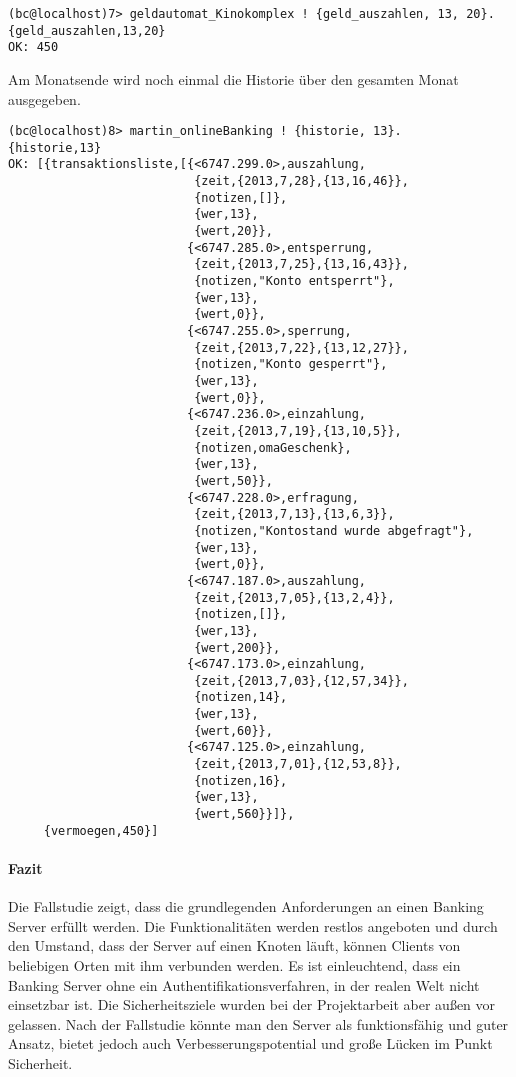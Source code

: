 \begin{lstlisting}
(bc@localhost)7> geldautomat_Kinokomplex ! {geld_auszahlen, 13, 20}.
{geld_auszahlen,13,20}
OK: 450  
\end{lstlisting}
Am Monatsende wird noch einmal die Historie über den gesamten Monat ausgegeben. 
\begin{lstlisting}
(bc@localhost)8> martin_onlineBanking ! {historie, 13}.                   
{historie,13}
OK: [{transaktionsliste,[{<6747.299.0>,auszahlung,
                          {zeit,{2013,7,28},{13,16,46}},
                          {notizen,[]},
                          {wer,13},
                          {wert,20}},
                         {<6747.285.0>,entsperrung,
                          {zeit,{2013,7,25},{13,16,43}},
                          {notizen,"Konto entsperrt"},
                          {wer,13},
                          {wert,0}},
                         {<6747.255.0>,sperrung,
                          {zeit,{2013,7,22},{13,12,27}},
                          {notizen,"Konto gesperrt"},
                          {wer,13},
                          {wert,0}},
                         {<6747.236.0>,einzahlung,
                          {zeit,{2013,7,19},{13,10,5}},
                          {notizen,omaGeschenk},
                          {wer,13},
                          {wert,50}},
                         {<6747.228.0>,erfragung,
                          {zeit,{2013,7,13},{13,6,3}},
                          {notizen,"Kontostand wurde abgefragt"},
                          {wer,13},
                          {wert,0}},
                         {<6747.187.0>,auszahlung,
                          {zeit,{2013,7,05},{13,2,4}},
                          {notizen,[]},
                          {wer,13},
                          {wert,200}},
                         {<6747.173.0>,einzahlung,
                          {zeit,{2013,7,03},{12,57,34}},
                          {notizen,14},
                          {wer,13},
                          {wert,60}},
                         {<6747.125.0>,einzahlung,
                          {zeit,{2013,7,01},{12,53,8}},
                          {notizen,16},
                          {wer,13},
                          {wert,560}}]},
     {vermoegen,450}]
\end{lstlisting}
\paragraph{Fazit}
Die Fallstudie zeigt, dass die grundlegenden Anforderungen an einen Banking Server erfüllt werden. Die Funktionalitäten werden restlos angeboten und durch den Umstand, dass der Server auf einen Knoten läuft, können Clients von beliebigen Orten mit ihm verbunden werden. Es ist einleuchtend, dass ein Banking Server ohne ein Authentifikationsverfahren, in der realen Welt nicht einsetzbar ist. Die Sicherheitsziele wurden bei der Projektarbeit aber außen vor gelassen. Nach der Fallstudie könnte man den Server als funktionsfähig und guter Ansatz, bietet jedoch auch Verbesserungspotential und große Lücken im Punkt Sicherheit.
